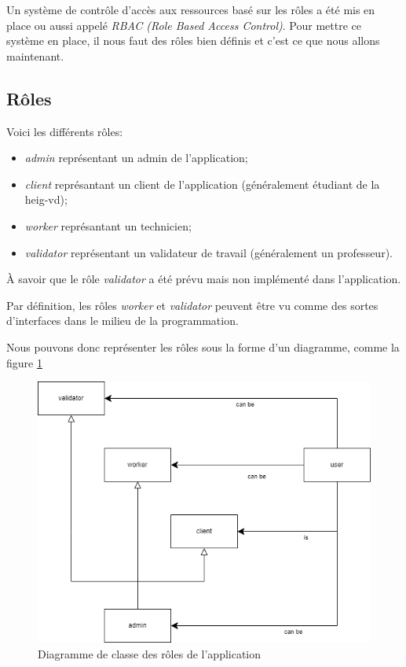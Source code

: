 \documentclass[
    iai, %
    il, %
]{heig-tb}
\begin{document}
Un système de contrôle d'accès aux ressources basé sur les rôles a été mis en place ou aussi appelé \emph{RBAC (Role Based Access Control)}.
Pour mettre ce système en place, il nous faut des rôles bien définis et c'est ce que nous allons maintenant.

\subsection{Rôles}
Voici les différents rôles:
\begin{itemize}
    \item \emph{admin} représentant un admin de l'application;
    \item \emph{client} représantant un client de l'application (généralement étudiant de la \Gls{heig-vd});
    \item \emph{worker} représantant un technicien;
    \item \emph{validator} représentant un validateur de travail (généralement un professeur).
\end{itemize}

À savoir que le rôle \emph{validator} a été prévu mais non implémenté dans l'application.

Par définition, les rôles \emph{worker} et \emph{validator} peuvent être vu comme des sortes d'interfaces dans le milieu de la programmation.

Nous pouvons donc représenter les rôles sous la forme d'un diagramme, comme la figure \ref{roles-diagram.drawio}

\begin{center}
    \begin{figure}[H]
        \includegraphics[width=\textwidth]{./assets/figures/roles-diagram.drawio.png}
        \caption{Diagramme de classe des rôles de l'application \label{roles-diagram.drawio}}
    \end{figure}
\end{center}
\end{document}
